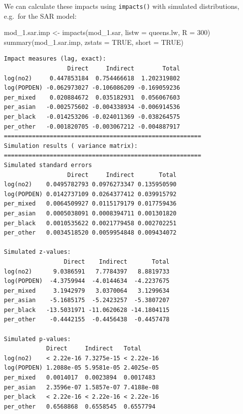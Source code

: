\documentclass[
  letterpaper,
  DIV=11,
  numbers=noendperiod]{scrreprt}
\newenvironment{Shaded}{\begin{snugshade}}{\end{snugshade}}
\newcommand{\AttributeTok}[1]{\textcolor[rgb]{0.40,0.45,0.13}{#1}}
\newcommand{\ConstantTok}[1]{\textcolor[rgb]{0.56,0.35,0.01}{#1}}
\newcommand{\DecValTok}[1]{\textcolor[rgb]{0.68,0.00,0.00}{#1}}
\newcommand{\FunctionTok}[1]{\textcolor[rgb]{0.28,0.35,0.67}{#1}}
\newcommand{\NormalTok}[1]{\textcolor[rgb]{0.00,0.23,0.31}{#1}}
\newcommand{\OtherTok}[1]{\textcolor[rgb]{0.00,0.23,0.31}{#1}}
\begin{document}
We can calculate these impacts using \texttt{impacts()} with simulated
distributions, e.g.~for the SAR model:

\begin{Shaded}
\begin{Highlighting}[]
\NormalTok{mod\_1.sar.imp }\OtherTok{\textless{}{-}} \FunctionTok{impacts}\NormalTok{(mod\_1.sar, }\AttributeTok{listw =}\NormalTok{ queens.lw, }\AttributeTok{R =} \DecValTok{300}\NormalTok{)}
\FunctionTok{summary}\NormalTok{(mod\_1.sar.imp, }\AttributeTok{zstats =} \ConstantTok{TRUE}\NormalTok{, }\AttributeTok{short =} \ConstantTok{TRUE}\NormalTok{)}
\end{Highlighting}
\end{Shaded}

\begin{verbatim}
Impact measures (lag, exact):
                  Direct     Indirect        Total
log(no2)     0.447853184  0.754466618  1.202319802
log(POPDEN) -0.062973027 -0.106086209 -0.169059236
per_mixed    0.020884672  0.035182931  0.056067603
per_asian   -0.002575602 -0.004338934 -0.006914536
per_black   -0.014253206 -0.024011369 -0.038264575
per_other   -0.001820705 -0.003067212 -0.004887917
========================================================
Simulation results ( variance matrix):
========================================================
Simulated standard errors
                  Direct     Indirect       Total
log(no2)    0.0495782793 0.0976273347 0.135950590
log(POPDEN) 0.0142737109 0.0264377412 0.039915792
per_mixed   0.0064509927 0.0115179179 0.017759436
per_asian   0.0005038091 0.0008394711 0.001301820
per_black   0.0010535622 0.0021779458 0.002702251
per_other   0.0034518520 0.0059954848 0.009434072

Simulated z-values:
                 Direct    Indirect       Total
log(no2)      9.0386591   7.7784397   8.8819733
log(POPDEN)  -4.3759944  -4.0144634  -4.2237675
per_mixed     3.1942979   3.0370064   3.1299634
per_asian    -5.1685175  -5.2423257  -5.3807207
per_black   -13.5031971 -11.0620628 -14.1804115
per_other    -0.4442155  -0.4456438  -0.4457478

Simulated p-values:
            Direct     Indirect   Total     
log(no2)    < 2.22e-16 7.3275e-15 < 2.22e-16
log(POPDEN) 1.2088e-05 5.9581e-05 2.4025e-05
per_mixed   0.0014017  0.0023894  0.0017483 
per_asian   2.3596e-07 1.5857e-07 7.4188e-08
per_black   < 2.22e-16 < 2.22e-16 < 2.22e-16
per_other   0.6568868  0.6558545  0.6557794 
\end{verbatim}
\end{document}
